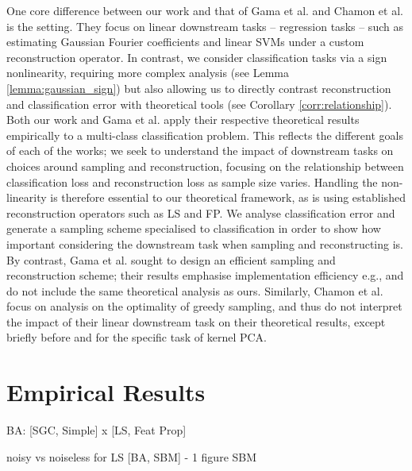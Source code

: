 One core difference between our work and that of Gama et al. and Chamon et al. is the setting. They focus on linear downstream tasks -- regression tasks -- such as estimating Gaussian Fourier coefficients and linear SVMs under a custom reconstruction operator. In contrast, we consider classification tasks via a sign nonlinearity, requiring more complex analysis (see Lemma \ref{lemma:gaussian_sign}) but also allowing us to directly contrast reconstruction and classification error with theoretical tools (see Corollary \ref{corr:relationship}). Both our work and Gama et al. apply their respective theoretical results empirically to a multi-class classification problem. This reflects the different goals of each of the works; we seek to understand the impact of downstream tasks on choices around sampling and reconstruction, focusing on the relationship between classification loss and reconstruction loss as sample size varies. Handling the non-linearity is therefore essential to our theoretical framework, as is using established reconstruction operators such as LS and FP. We analyse classification error and generate a sampling scheme specialised to classification in order to show how important considering the downstream task when sampling and reconstructing is. By contrast, Gama et al. sought to design an efficient sampling and reconstruction scheme; their results emphasise implementation efficiency e.g., \cite[Proposition 3]{gama2020rethinking} and  do not include the same theoretical analysis as ours. Similarly, Chamon et al. focus on analysis on the optimality of greedy sampling, and thus do not interpret the impact of their linear downstream task on their theoretical results, except briefly before \cite[Remark 2]{chamon2017greedy} and for the specific task of kernel PCA.

\section{Empirical Results}
\iffalse
BA:
[SGC, Simple] 
x
[LS,
Feat Prop]

noisy vs noiseless for LS
[BA, SBM] - 1 figure SBM

